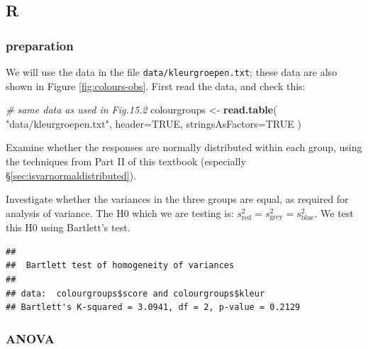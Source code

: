 \documentclass[
]{book}
\newenvironment{Shaded}{\begin{snugshade}}{\end{snugshade}}
\newcommand{\AttributeTok}[1]{\textcolor[rgb]{0.13,0.29,0.53}{#1}}
\newcommand{\CommentTok}[1]{\textcolor[rgb]{0.56,0.35,0.01}{\textit{#1}}}
\newcommand{\ConstantTok}[1]{\textcolor[rgb]{0.56,0.35,0.01}{#1}}
\newcommand{\FunctionTok}[1]{\textcolor[rgb]{0.13,0.29,0.53}{\textbf{#1}}}
\newcommand{\NormalTok}[1]{#1}
\newcommand{\OtherTok}[1]{\textcolor[rgb]{0.56,0.35,0.01}{#1}}
\newcommand{\SpecialCharTok}[1]{\textcolor[rgb]{0.81,0.36,0.00}{\textbf{#1}}}
\newcommand{\StringTok}[1]{\textcolor[rgb]{0.31,0.60,0.02}{#1}}
\begin{document}
\subsection{R}\label{r-15}

\subsubsection{preparation}\label{preparation-3}

We will use the data in the file \texttt{data/kleurgroepen.txt}; these data are also shown in Figure \ref{fig:colours-obs}. First read the data, and check this:

\begin{Shaded}
\begin{Highlighting}[]
\CommentTok{\# same data as used in Fig.15.2}
\NormalTok{colourgroups }\OtherTok{\textless{}{-}} \FunctionTok{read.table}\NormalTok{( }\StringTok{"data/kleurgroepen.txt"}\NormalTok{, }
                            \AttributeTok{header=}\ConstantTok{TRUE}\NormalTok{, }\AttributeTok{stringsAsFactors=}\ConstantTok{TRUE}\NormalTok{ )}
\end{Highlighting}
\end{Shaded}

Examine whether the responses are normally distributed within each group, using
the techniques from Part II of this textbook (especially
§\ref{sec:isvarnormaldistributed}).

Investigate whether the variances in the three groups are equal, as required
for analysis of variance. The H0 which we are testing is:
\(s^2_\textrm{red} = s^2_\textrm{grey} = s^2_\textrm{blue}\). We
test this H0 using Bartlett's test.

\begin{Shaded}
\end{Shaded}

\begin{verbatim}
## 
##  Bartlett test of homogeneity of variances
## 
## data:  colourgroups$score and colourgroups$kleur
## Bartlett's K-squared = 3.0941, df = 2, p-value = 0.2129
\end{verbatim}

\subsubsection{ANOVA}\label{anova-2}
\end{document}
